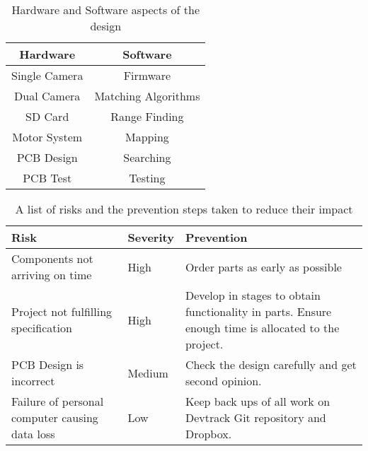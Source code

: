 \begin{table}
\centering
\caption{Hardware and Software aspects of the design}
\label{table:sections}
\begin{tabular}{cc}\toprule
Hardware & Software \\ \toprule
Single Camera	&	Firmware \\ \midrule
Dual Camera		&	Matching Algorithms \\ \midrule
SD Card			&	Range Finding \\ \midrule
Motor System	&	Mapping  \\ \midrule
PCB Design		&	Searching \\ \midrule
PCB Test		&	Testing \\ \bottomrule
\end{tabular}
\end{table}

\begin{table}
\centering
\caption{A list of risks and the prevention steps taken to reduce their impact}
\label{tab:risk}
\begin{tabular}{p{6cm}p{2cm}p{6cm}}\toprule
Risk						&	Severity	&	Prevention \\ \toprule
Components not arriving on time	&	High		&	Order parts as early as possible \\ \midrule
Project not fulfilling specification				&	High		&	Develop in stages to obtain functionality in parts. Ensure enough time is allocated to the project.	\\\midrule
PCB Design is incorrect		&	Medium		&	Check the design carefully and get second opinion. \\\midrule
Failure of personal computer causing data loss & Low	& 	Keep back ups of all work on Devtrack Git repository and Dropbox.\\
\bottomrule
\end{tabular}
\end{table}

